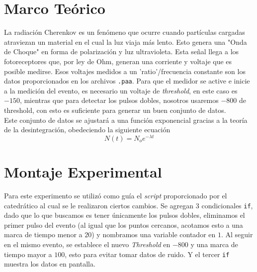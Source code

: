 \documentclass[conference]{IEEEtran}
\begin{document}
\section{Marco Teórico}
    La radiación Cherenkov es un fenómeno que ocurre cuando partículas cargadas atraviezan un material en el cual la luz viaja más lento. Esto genera una "Onda de Choque" en forma de polarización y luz ultravioleta. Esta señal llega a los fotoreceptores que, por ley de Ohm, generan una corriente y voltaje que es posible medirse. Esos voltajes medidos a un 'ratio'/frecuencia constante son los datos proporcionados en los archivos \texttt{.paa}. Para que el medidor se active e inicie a la medición del evento, es necesario un voltaje de \textit{threshold}, en este caso es $-150$, mientras que para detectar los pulsos dobles, nosotros usaremos $-800$ de threshold, con esto es suficiente para generar un buen conjunto de datos. \\
    
   Este conjunto de datos se ajustará a una función exponencial gracias a la teoría de la desintegración, obedeciendo la siguiente ecuación
	$$N(t) = N_o e^{-\lambda t}$$



\section{Montaje Experimental}
%

Para este experimento se utilizó como guía el \textit{script} proporcionado por el catedrático al cual se le realizaron ciertos cambios. Se agregan 3 condicionales \texttt{if}, dado que lo que buscamos es tener únicamente los pulsos dobles, eliminamos el primer pulso del evento (al igual que los puntos cercanos, acotamos esto a una marca de tiempo menor a $20$) y nombramos una variable contador en $1$. Al seguir en el mismo evento, se establece el nuevo \textit{Threshold} en $-800$ y una marca de tiempo mayor a $100$, esto para evitar tomar datos de ruido. Y el tercer \texttt{if} muestra los datos en pantalla. \\
\end{document}
